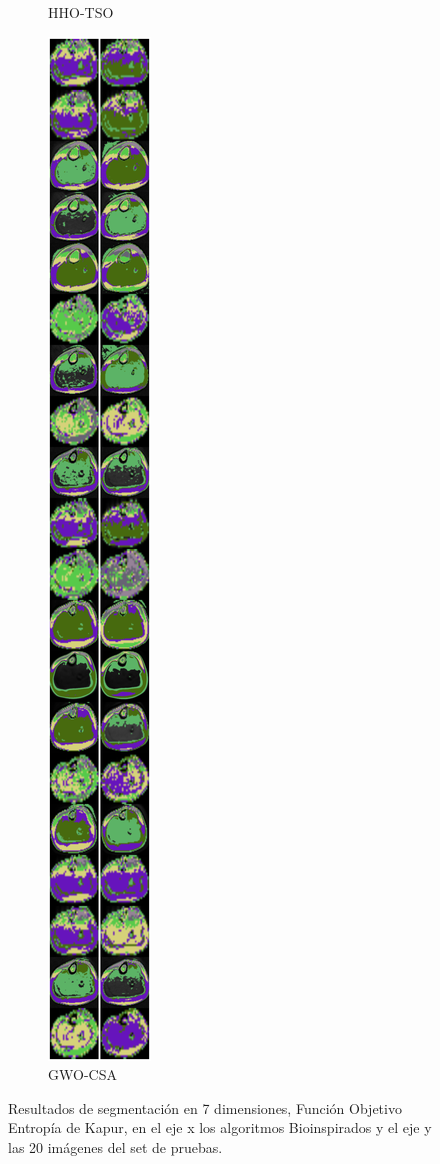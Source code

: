\documentclass[conference]{IEEEtran}
\begin{document}
\begin{figure}[!htb]
\begin{subfigure}[b]{0.13\textwidth}
		\caption{HHO-TSO}
		\label{fig:imagen2}
	\end{subfigure}
	\begin{subfigure}[b]{0.13\textwidth}
		\includegraphics[width=\textwidth]{Umbrales/kapur/Dim7/GWO_CSA_Dim7_Kapur.png}
		\caption{GWO-CSA}
		\label{fig:imagen2}
	\end{subfigure}

	
	\caption{Resultados de segmentación en 7 dimensiones, Función Objetivo Entropía de Kapur, en el eje x los algoritmos Bioinspirados y el eje y las 20 imágenes del set de pruebas.}
	\label{fig:resultados7dim}
\end{figure}
\end{document}

